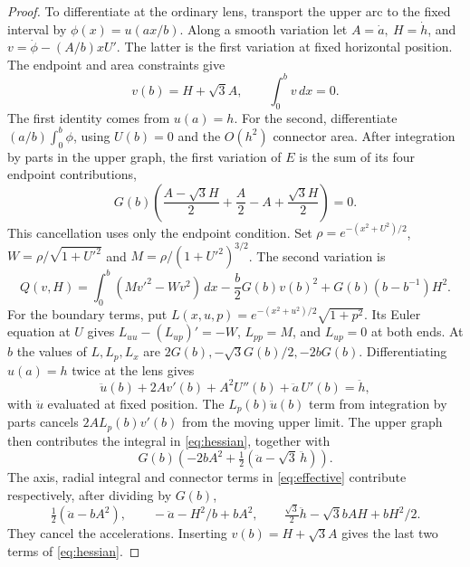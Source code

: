\begin{proof}
To differentiate at the ordinary lens, transport the upper arc to
the fixed interval by \(\phi(x)=u(ax/b)\). Along a smooth variation
let \(A=\dot a,\ H=\dot h\), and \(v=\dot\phi-(A/b)xU'\). The latter
is the first variation at fixed horizontal position. The endpoint and
area constraints give
\begin{equation}
 v(b)=H+\sqrt3 A,\qquad \int_0^b v\,dx=0.
 \label{eq:variation-constraint}
\end{equation}
The first identity comes from \(u(a)=h\). For the second, differentiate
\((a/b)\int_0^b\phi\), using \(U(b)=0\) and the \(O(h^2)\) connector
area. After integration by parts in the upper graph, the first variation
of \(E\) is the sum of its four endpoint contributions,
\[
 G(b)\left(\frac{A-\sqrt3 H}{2}+\frac A2-A+\frac{\sqrt3 H}{2}\right)=0 .
\]
This cancellation uses only the endpoint condition. Set \(\rho=e^{-(x^2+U^2)/2}\), \(W=\rho/\sqrt{1+U'^2}\) and
\(M=\rho/(1+U'^2)^{3/2}\). The second variation is
\begin{equation}
 Q(v,H)=
 \int_0^b(Mv'^2-Wv^2)\,dx-\frac b2G(b)v(b)^2
 +G(b)(b-b^{-1})H^2 .
 \label{eq:hessian}
\end{equation}
For the boundary terms, put
\(L(x,u,p)=e^{-(x^2+u^2)/2}\sqrt{1+p^2}\).
Its Euler equation at \(U\) gives \(L_{uu}-(L_{up})'=-W\),
\(L_{pp}=M\), and \(L_{up}=0\) at both ends. At \(b\) the
values of \(L,L_p,L_x\) are \(2G(b),-\sqrt3 G(b)/2,-2bG(b)\).
Differentiating \(u(a)=h\) twice at the lens gives
\[
 \ddot u(b)+2Av'(b)+A^2U''(b)+\ddot a\,U'(b)=\ddot h ,
\]
with \(\ddot u\) evaluated at fixed position. The \(L_p(b)\ddot u(b)\)
term from integration by parts cancels \(2A L_p(b)v'(b)\) from the
moving upper limit. The upper graph then contributes the integral in
\eqref{eq:hessian}, together with
\[
 G(b)\left(-2bA^2+\tfrac12(\ddot a-\sqrt3\,\ddot h)\right).
\]
The axis, radial integral and connector terms in \eqref{eq:effective}
contribute respectively, after dividing by \(G(b)\),
\[
 \tfrac12(\ddot a-bA^2),\qquad
 -\ddot a-H^2/b+bA^2,\qquad
 \tfrac{\sqrt3}{2}\ddot h-\sqrt3 bAH+bH^2/2 .
\]
They cancel the accelerations. Inserting
\(v(b)=H+\sqrt3 A\) gives the last two terms of \eqref{eq:hessian}.


\end{proof}

